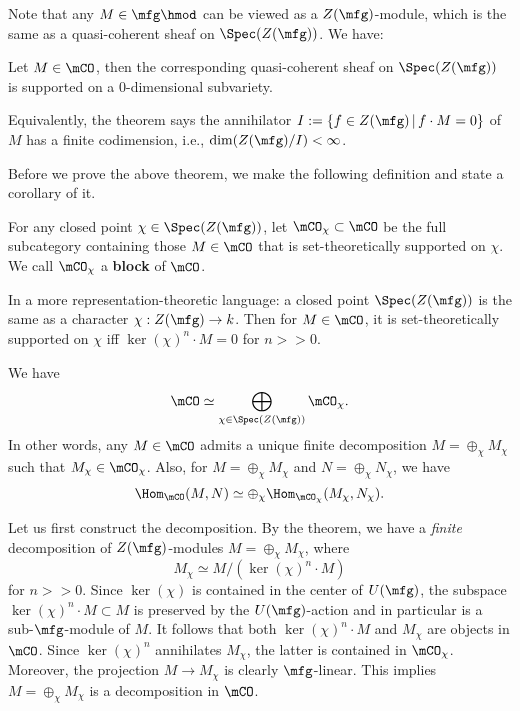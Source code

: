 Note that any $M\in \mfg\hmod$ can be viewed as a $Z(\mfg)$-module, which is the same as a quasi-coherent sheaf on $\Spec(Z(\mfg))$. We have:

\begin{thm}
	\label{thm-block}
	Let $M\in \mCO$, then the corresponding quasi-coherent sheaf on $\Spec(Z(\mfg))$ is supported on a 0-dimensional subvariety.
\end{thm}

\begin{rem}
	Equivalently, the theorem says the annihilator $I:=\{ f\in Z(\mfg)\,\vert\, f\cdot M=0 \}$ of $M$ has a finite codimension, i.e., $\dim(Z(\mfg)/I)<\infty$.
\end{rem}

Before we prove the above theorem, we make the following definition and state a corollary of it.

\begin{defn}
	For any closed point $\chi\in \Spec(Z(\mfg))$, let $\mCO_\chi \subset \mCO$ be the full subcategory containing those $M\in \mCO$ that is set-theoretically supported on $\chi$. We call $\mCO_\chi$ a \textbf{block} of $\mCO$.
\end{defn}

\begin{rem}
	In a more representation-theoretic language: a closed point $\Spec(Z(\mfg))$ is the same as a character $\chi: Z(\mfg) \to k$. Then for $M\in \mCO$, it is set-theoretically supported on $\chi$ iff $\ker(\chi)^n \cdot M = 0$ for $n>>0$.

\end{rem}

\begin{cor}
	We have
	\[
		\mCO \simeq \bigoplus_{\chi\in \Spec(Z(\mfg))} \mCO_\chi.
	\]
	In other words, any $M\in \mCO$ admits a unique finite decomposition $M = \oplus_\chi M_\chi$ such that $M_\chi \in \mCO_\chi$. Also, for $M = \oplus_\chi M_\chi$ and $N = \oplus_\chi N_\chi$, we have
	\[
		\Hom_\mCO( M,N ) \simeq \oplus_\chi \Hom_{\mCO_\chi} ( M_\chi, N_\chi ).
	\]
\end{cor}

\proof
	Let us first construct the decomposition. By the theorem, we have a \emph{finite} decomposition of $Z(\mfg)$-modules $M = \oplus_\chi M_\chi$, where
	\[
		M_\chi \simeq M/(\ker(\chi)^n\cdot M)
	\]
	for $n>>0$. Since $\ker(\chi)$ is contained in the center of $U(\mfg)$, the subspace $\ker(\chi)^n\cdot M \subset M$ is preserved by the $U(\mfg)$-action and in particular is a sub-$\mfg$-module of $M$. It follows that both $\ker(\chi)^n\cdot M $ and $M_\chi$ are objects in $\mCO$. Since $\ker(\chi)^n$ annihilates $M_\chi$, the latter is contained in $\mCO_\chi$. Moreover, the projection $M\to M_\chi$ is clearly $\mfg$-linear. This implies $M = \oplus_\chi M_\chi$ is a decomposition in $\mCO$.

